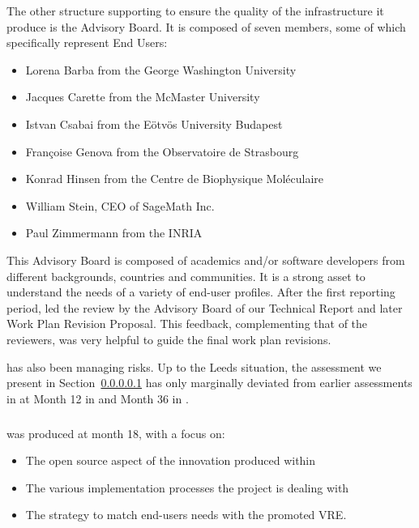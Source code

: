 
The other structure supporting \ODK to ensure the quality of the
infrastructure it produce is the Advisory Board. It is composed of
seven members, some of which specifically represent End Users:

\begin{itemize}
\item{Lorena Barba from the George Washington University}
\item{Jacques Carette from the McMaster University}
\item{Istvan Csabai from the Eötvös University Budapest}
\item{Françoise Genova from the Observatoire de Strasbourg}
\item{Konrad Hinsen from the Centre de Biophysique Moléculaire}
\item{William Stein, CEO of SageMath Inc.}
\item{Paul Zimmermann from the INRIA}
\end{itemize}

This Advisory Board is composed of academics and/or software
developers from different backgrounds, countries and communities. It
is a strong asset to understand the needs of a variety of end-user
profiles. After the first reporting period,  led the review
by the Advisory Board of our Technical Report and later Work Plan
Revision Proposal. This feedback, complementing that of the reviewers,
was very helpful to guide the final work plan revisions.

 has also been managing risks. Up to the Leeds situation, the
assessment we present in Section~\ref{} has only marginally deviated
from earlier assessments in at Month 12 in 
and Month 36 in .

\subparagraph{}

 was produced at month 18, with a focus on:

\begin{itemize}
\item{The open source aspect of the innovation produced within \ODK}
\item{The various implementation processes the project is dealing with}
\item{The strategy to match end-users needs with the promoted VRE}.
\end{itemize}

